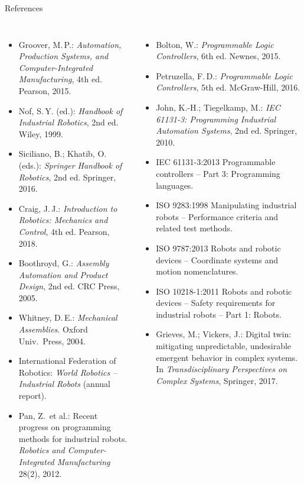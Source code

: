 \documentclass[aspectratio=169,10pt]{beamer}
\begin{document}
\begin{frame}[t]{References}
\fontsize{6}{7}\selectfont\setlength{\itemsep}{0pt}
\begin{columns}[T,onlytextwidth]
\begin{itemize}
\item Groover, M.\,P.: \emph{Automation, Production Systems, and Computer-Integrated Manufacturing}, 4th ed. Pearson, 2015.
\item Nof, S.\,Y. (ed.): \emph{Handbook of Industrial Robotics}, 2nd ed. Wiley, 1999.
\item Siciliano, B.; Khatib, O. (eds.): \emph{Springer Handbook of Robotics}, 2nd ed. Springer, 2016.
\item Craig, J.\,J.: \emph{Introduction to Robotics: Mechanics and Control}, 4th ed. Pearson, 2018.
\item Boothroyd, G.: \emph{Assembly Automation and Product Design}, 2nd ed. CRC Press, 2005.
\item Whitney, D.\,E.: \emph{Mechanical Assemblies}. Oxford Univ.\ Press, 2004.
\item International Federation of Robotics: \emph{World Robotics -- Industrial Robots} (annual report).
\item Pan, Z.\ et al.: Recent progress on programming methods for industrial robots. \emph{Robotics and Computer-Integrated Manufacturing} 28(2), 2012.
\end{itemize}
\begin{itemize}
\item Bolton, W.: \emph{Programmable Logic Controllers}, 6th ed. Newnes, 2015.
\item Petruzella, F.\,D.: \emph{Programmable Logic Controllers}, 5th ed. McGraw-Hill, 2016.
\item John, K.-H.; Tiegelkamp, M.: \emph{IEC 61131-3: Programming Industrial Automation Systems}, 2nd ed. Springer, 2010.
\item IEC 61131-3:2013 Programmable controllers -- Part 3: Programming languages.
\item ISO 9283:1998 Manipulating industrial robots -- Performance criteria and related test methods.
\item ISO 9787:2013 Robots and robotic devices -- Coordinate systems and motion nomenclatures.
\item ISO 10218-1:2011 Robots and robotic devices -- Safety requirements for industrial robots -- Part 1: Robots.
\item Grieves, M.; Vickers, J.: Digital twin: mitigating unpredictable, undesirable emergent behavior in complex systems. In \emph{Transdisciplinary Perspectives on Complex Systems}, Springer, 2017.
\end{itemize}
\end{columns}
\end{frame}
\end{document}
